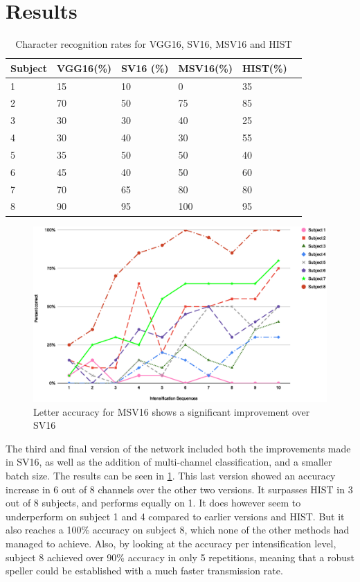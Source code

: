 \documentclass[conference]{IEEEtran}
\begin{document}
\section{Results}
\label{sec:results}

\begin{table}[h]
\centering
\begin{tabular}{ |p{1cm}||p{1cm}|p{1cm}|p{1cm}|p{1cm}|p{1cm}| }
 \hline
 Subject & VGG16(\%) & SV16 (\%)  & MSV16(\%) & HIST(\%)\\
 \hline
 1 & 15 & 10 & 0 & 35\\
 2 & 70 & 50 & 75 & 85\\
 3 & 30 & 30 & 40 & 25\\
 4 & 30 & 40 & 30 & 55\\
 5 & 35 & 50 & 50 & 40\\
 6 & 45 & 40 & 50 & 60\\
 7 & 70 & 65 & 80 & 80\\
 8 & 90 & 95 & 100 & 95\\
 \hline
\end{tabular}
\caption[MSV16 accuracy comparison]{Character recognition rates for VGG16, SV16, MSV16 and HIST}
\label{tab:resultsv1v2v3}
\end{table}
\begin{figure}[h]
  \centering
  \includegraphics[width=\linewidth]{images/v3intensification.eps}
  \caption[MSV16 Letter accuracy]{Letter accuracy for MSV16 shows a significant improvement over SV16}
  \label{image:v3intensification}
\end{figure}
The third and final version of the network included both the improvements made in SV16, as well as the addition of multi-channel classification, and a smaller batch size. The results can be seen in \ref{tab:resultsv1v2v3}. This last version showed an accuracy increase in 6 out of 8 channels over the other two versions. It surpasses HIST in 3 out of 8 subjects, and performs equally on 1. 
It does however seem to underperform on subject 1 and 4 compared to earlier versions and HIST. But it also reaches a 100\% accuracy on subject 8, which none of the other methods had managed to achieve.
Also, by looking at the accuracy per intensification level, subject 8 achieved over 90\% accuracy in only 5 repetitions, meaning that a robust speller could be established with a much faster transmission rate. 
\end{document}
